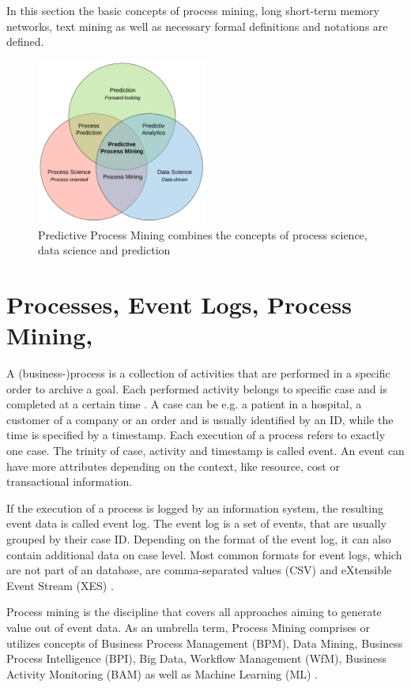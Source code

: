 In this section the basic concepts of process mining, long short-term memory networks, text mining as well as necessary formal definitions and notations are defined.


\begin{figure}
	\centering
	\includegraphics[width=0.5\textwidth]{figures/predictive-process-mining}
	\caption{Predictive Process Mining combines the concepts of process science, data science and prediction}
\end{figure}


\section{Processes, Event Logs, Process Mining, }

A (business-)process is a collection of activities that are performed in a specific order to archive a goal.
Each performed activity belongs to specific case and is completed at a certain time \cite{DBLP:conf/bpm/AalstAM11}.
A case can be e.g. a patient in a hospital, a customer of a company or an order and is usually identified by an ID, while 
the time is specified by a timestamp.
Each execution of a process refers to exactly one case.
The trinity of case, activity and timestamp is called event.
An event can have more attributes depending on the context, like resource, cost or transactional information.

If the execution of a process is logged by an information system, the resulting event data is called event log.
The event log is a set of events, that are usually grouped by their case ID. Depending on the format of the event log, it can also contain additional data on case level.
Most common formats for event logs, which are not part of an database, are comma-separated values (CSV) and eXtensible Event Stream (XES) \cite{DBLP:conf/caise/VerbeekBDA10a}.

Process mining is the discipline that covers all approaches aiming to generate value out of event data.
As an umbrella term, Process Mining comprises or utilizes concepts of Business Process Management (BPM), Data Mining, Business Process Intelligence (BPI), Big Data, Workflow Management (WfM), Business Activity Monitoring (BAM) \cite{DBLP:books/sp/Aalst16} as well as Machine Learning (ML) \cite{DBLP:conf/caise/EvermannRF17}.

